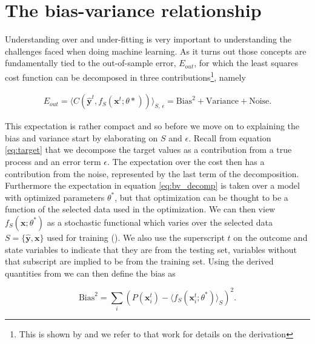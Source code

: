 \section{The bias-variance relationship}\label{sec:bv}

Understanding over and under-fitting is very important to understanding the challenges faced when doing machine learning. As it turns out those concepts are fundamentally tied to the out-of-sample error, $E_{out}$, for which the least squares cost function can be decomposed in three contributions\footnote{This is shown by \citet{Mehta2019} and we refer to that work for details on the derivation}, namely

\begin{align}\label{eq:bv_decomp}
E_{out} = \langle C(\mathbf{\hat{y}}^t, f_S(\mathbf{x}^t; \theta*))\rangle_{S,\, \epsilon} = \text{Bias}^2 + \text{Variance} + \text{Noise}.
\end{align}

\noindent This expectation is rather compact and so before we move on to explaining the bias and variance start by elaborating on $S$ and $\epsilon$. Recall from equation \ref{eq:target} that we decompose the target values as a contribution from a true process and an error term $\epsilon$. The expectation over the cost then has a contribution from the noise, represented by the last term of the decomposition. Furthermore the expectation in equation \ref{eq:bv_decomp} is taken over a model with optimized parameters $\theta^*$, but that optimization can be thought to be a function of the selected data used in the optimization. We can then view $f_S(\mathbf{x}; \theta^*)$ as a stochastic functional which varies over the selected data $S = \{\mathbf{\hat{y}}, \mathbf{x}\}$ used for training (\cite{Mehta2019}). We also use the superscript $t$ on the outcome and state variables to indicate that they are from the testing set, variables without that subscript are implied to be from the training set.
 Using the derived quantities from \citet{Mehta2019} we can then define the bias as

\begin{equation}
\text{Bias}^2 = \sum_i (P(\mathbf{x}_i^t) - \langle f_S(\mathbf{x}_i^t; \theta^*)\rangle_S)^2.
\end{equation}

